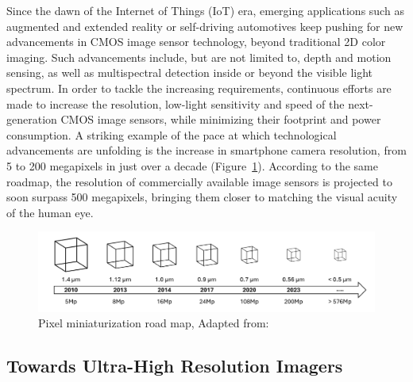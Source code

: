Since the dawn of the Internet of Things (IoT) era, emerging applications such as augmented and extended reality or self-driving automotives keep pushing for new advancements in CMOS image sensor technology, beyond traditional 2D color imaging. Such advancements include, but are not limited to, depth and motion sensing, as well as multispectral detection inside or beyond the visible light spectrum. In order to tackle the increasing requirements, continuous efforts are made to increase the resolution, low-light sensitivity and speed of the next-generation CMOS image sensors, while minimizing their footprint and power consumption. A striking example of the pace at which technological advancements are unfolding is the increase in smartphone camera resolution, from 5 to 200 megapixels in just over a decade (Figure~\ref{fig:ch1:pixel_size}). According to the same roadmap, the resolution of commercially available image sensors is projected to soon surpass 500 megapixels, bringing them closer to matching the visual acuity of the human eye.


\begin{figure} [htbp]
  \centering
  \medskip
  \includegraphics[width=.99\textwidth]{chapters/introduction/image/pixel_miniaturization.pdf}
  \caption[Short caption for Table of Figures]{Pixel miniaturization road map, Adapted from: \cite{SookyoungRoh2025Dispersion-engineeredSensors}}
  \label{fig:ch1:pixel_size}
\end{figure}

\subsection{Towards Ultra-High Resolution Imagers}

